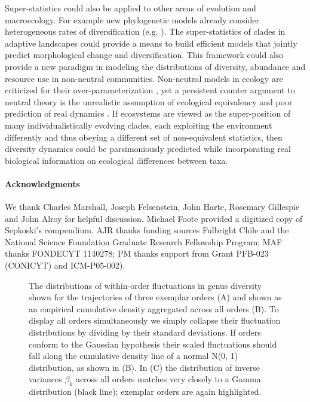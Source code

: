 Super-statistics could also be applied to other areas of evolution and
macroecology.  For example new phylogenetic models already consider
heterogeneous rates of diversification
(e.g. \cite{rabosky2006laser}). The super-statistics of clades in
adaptive landscapes could provide a means to build efficient models
that jointly predict morphological change and diversification. This
framework could also provide a new paradigm in modeling the
distributions of diversity, abundance and resource use in non-neutral
communities. Non-neutral models in ecology are criticized for their
over-parameterization \cite{rosindell2011}, yet a persistent counter
argument to neutral theory \cite{hubbell2001} is the unrealistic
assumption of ecological equivalency \cite{chave2004neutral} and poor
prediction of real dynamics \cite{ricklefs2006neutral}. If ecosystems
are viewed as the super-position of many individualistically evolving
clades, each exploiting the environment differently and thus obeying a
different set of non-equivalent statistics, then diversity dynamics
could be parsimoniously predicted while incorporating real biological
information on ecological differences between taxa.


\paragraph{Acknowledgments}

  We thank Charles Marshall, Joseph Felsenstein, John Harte, Rosemary
  Gillespie and John Alroy for helpful discussion. Michael Foote
  provided a digitized copy of Sepkoski's compendium. AJR thanks
  funding sources Fulbright Chile and the National Science Foundation
  Graduate Research Fellowship Program; MAF thanks FONDECYT 1140278;
  PM thanks support from Grant PFB-023 (CONICYT) and ICM-P05-002).

% 
% 

\begin{figure}
  \caption{The distributions of within-order fluctuations in genus
    diversity shown for the trajectories of three exemplar orders (A)
    and shown as an empirical cumulative density aggregated across all
    orders (B). To display all orders simultaneously we simply
    collapse their fluctuation distributions by dividing by their
    standard deviations. If orders conform to the Gaussian hypothesis
    their scaled fluctuations should fall along the cumulative density
    line of a normal N(0, 1) distribution, as shown in (B). In (C) the
    distribution of inverse variances $\beta_k$ across all orders
    matches very closely to a Gamma distribution (black line);
    exemplar orders are again highlighted.}
  \label{fig:pk_f}
\end{figure}

